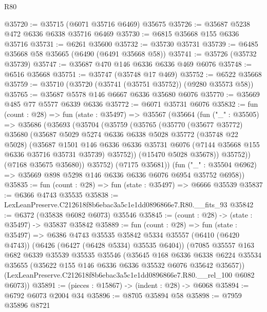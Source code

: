 \begin{lexlean}{R80}
\begin{coremodule}
@35720 := @35715 (@6071 @35716 @6469) @35675
@35726 := @35687 @5238 @472 @6336 @6338 @35716 @6469
@35730 := @6815 @35668 @155 @6336 @35716
@35731 := @6261 @35600
@35732 := @35730 @35731
@35739 := @6485 @35668 @58 @35665 (@6490 (@6491 @35668 @58))
@35741 := @35726 (@35732 @35739)
@35747 := @35687 @470 @146 @6336 @6336 @469 @6076
@35748 := @6516 @35668
@35751 := @35747 (@35748 @17 @469)
@35752 := @6522 @35668
@35759 := @35710 (@35720 (@35741 (@35751 @35752)) (@9280 @35573 @58))
@35765 := @35687 @5578 @146 @6667 @6336 @35680 @6076
@35770 := @35669 @485 @77 @5577 @6339 @6336
@35772 := @6071 @35731 @6076
@35832 := fun (count : @28) =>
  fun (state : @35497) =>
  @35567
    (@35664
      (fun ("_" : @35505) =>
      @35686
        (@35693
          (@35704
            (@35759
              (@35765
                (@35770
                  (@35677 @35772)
                  @35680
                  (@35687
                    @5029
                    @5274
                    @6336
                    @6338
                    @5028
                    @35772
                    (@35748 @22 @5028)
                    (@35687
                      @1501
                      @146
                      @6336
                      @6336
                      @35731
                      @6076
                      (@7144 @35668 @155 @6336 @35716 @35731 @35739)
                      @35752))
                  (@15470 @5028 @35678))
                @35752))
            (@7168 @35675 @35680))
          @35752)
        (@7175 @35681))
      (fun ("_" : @35504 @6962) => @35669 @898 @5298 @146 @6336 @6336 @6076 @6954 @35752 @6958))
@35835 := fun (count : @28) => fun (state : @35497) => @6666 @35539
@35837 := @6366 @4743 @35535
@35838 := LexLeanPreserve.C212618f8b6ebac3a5c1e1dd0896866e7.R80.__fits_93
@35842 := @6372 (@35838 @6082 @6073) @35546
@35845 := (count : @28) -> (state : @35497) -> @35837 @35842
@35889 := fun (count : @28) =>
  fun (state : @35497) =>
  @6386
    @4743
    @35535
    @35842
    @5334
    @35557
    (@6410 (@6420 @4743))
    (@6426 (@6427 (@6428 @5334) @35535 @6404))
    (@7085
      @35557
      @163
      @682
      @6339
      @35539
      @35535
      @35546
      (@35645
        @168
        @6336
        @6338
        @6224
        @35534
        @35655
        (@35622 @155 @146 @6336 @6336 @35532 @6076 @35642 @35657))
      (LexLeanPreserve.C212618f8b6ebac3a5c1e1dd0896866e7.R80.__rel_100 @6082 @6073))
@35891 := (pieces : @15867) -> (indent : @28) -> @6068
@35894 := @6792 @6073 @2004 @34
@35896 := @8705 @35894 @58
@35898 := @7959 @35896 @8721

\end{coremodule}
\end{lexlean}
